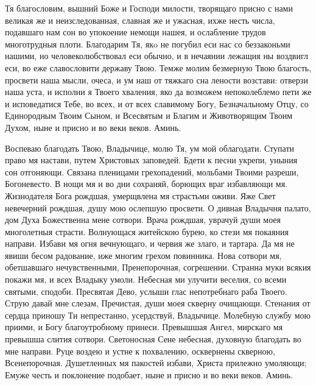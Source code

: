 

Тя благословим, вышний Боже и Господи милости, творящаго присно с нами великая же и неизследованная, славная же и ужасная, ихже несть числа, подавшаго нам сон во упокоение немощи нашея, и ослабление трудов многотрудныя плоти. Благодарим Тя, якo не погубил еси нас со беззаконьми нашими, но человеколюбствовал еси обычно, и в нечаянии лежащия ны воздвигл еси, во еже славословити державу Твою. Темже молим безмерную Твою благость, просвети наша мысли, очеса, и ум наш от тяжкаго сна лености возстави: отверзи наша уста, и исполни я Твоего хваления, яко да возможем непоколеблемо пети же и исповедатися Тебе, во всех, и от всех славимому Богу, Безначальному Отцу, со Единородным Твоим Сыном, и Всесвятым и Благим и Животворящим Твоим Духом, ныне и присно и во веки веков. Аминь. 




Воспеваю благодать Твою, Владычице, молю Тя, ум мой облагодати. Ступати право мя настави, путем Христовых заповедей. Бдети к песни укрепи, уныния сон отгоняющи. Связана пленицами грехопадений, мольбами Твоими разреши, Богоневесто. В нощи мя и во дни сохраняй, борющих враг избавляющи мя. Жизнодателя Бога рождшая, умерщвлена мя страстьми оживи. Яже Свет невечерний рождшая, душу мою ослепшую просвети. О дивная Владычня палато, дом Духа Божественна мене сотвори. Врача рождшая, уврачуй души моея многолетныя страсти. Волнующася житейскою бурею, ко стези мя покаяния направи. Избави мя огня вечнующаго, и червия же злаго, и тартара. Да мя не явиши бесом радование, иже многим грехом повинника. Нова сотвори мя, обетшавшаго нечувственными, Пренепорочная, согрешении. Странна муки всякия покажи мя, и всех Владыку умоли. Небесная ми улучити веселия, со всеми святыми, сподоби. Пресвятая Дево, услыши глас непотребнаго раба Твоего. Струю давай мне слезам, Пречистая, души моея скверну очищающи. Стенания от сердца приношу Ти непрестанно, усердствуй, Владычице. Молебную службу мою приими, и Богу благоутробному принеси. Превышшая Ангел, мирскаго мя превышша слития сотвори. Светоносная Сене небесная, духовную благодать во мне направи. Руце воздею и устне к похвалению, осквернены скверною, Всенепорочная. Душетленных мя пакостей избави, Христа прилежно умоляющи; Емуже честь и поклонение подобает, ныне и присно и во веки веков. Аминь. 



